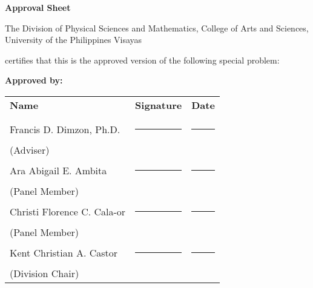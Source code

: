 \begin{center}
	\textbf{Approval Sheet}
	
	The Division of Physical Sciences and Mathematics, College of Arts and Sciences, University of the Philippines Visayas 
	
	certifies that this is the approved version of the following special problem:
	
\end{center}

{\small\textbf{Approved by:}}

\newcommand{\signaturerule}{\rule{10em}{.4pt}}
\begin{tabular}{lll}
	\bfseries Name  & \bfseries Signature & \bfseries Date\\ \\
	Francis D. Dimzon, Ph.D. &\signaturerule  & \signaturerule\\ 
	\multicolumn{1}{l}{(Adviser)} \\ 
	Ara Abigail E. Ambita &\signaturerule &\signaturerule\\
	\multicolumn{1}{l}{(Panel Member)}  \\
	Christi Florence C. Cala-or &\signaturerule &\signaturerule\\
	\multicolumn{1}{l}{(Panel Member)}\\
	Kent Christian A. Castor &\signaturerule &\signaturerule\\
	\multicolumn{1}{l}{(Division Chair)}
	
\end{tabular}
